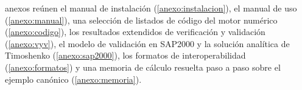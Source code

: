anexos reúnen el manual de instalación (\autoref{anexo:instalacion}), el manual de uso (\autoref{anexo:manual}), una selección de listados de código del motor numérico (\autoref{anexo:codigo}), los resultados extendidos de verificación y validación (\autoref{anexo:vyv}), el modelo de validación en SAP2000 y la solución analítica de Timoshenko (\autoref{anexo:sap2000}), los formatos de interoperabilidad (\autoref{anexo:formatos}) y una memoria de cálculo resuelta paso a paso sobre el ejemplo canónico (\autoref{anexo:memoria}).
